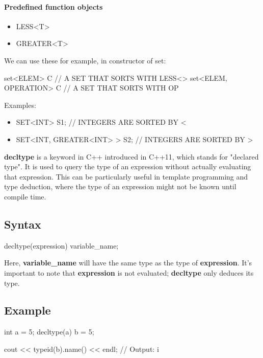 \documentclass{report}
\begin{document}
   \paragraph{Predefined function objects}
   \bigbreak \noindent \bigbreak \noindent 
   \begin{itemize}
       \item LESS<T>
       \item GREATER<T>
    \end{itemize}
   We can use these for example, in constructor of set:
   \bigbreak \noindent 
   \begin{cppcode}
       set<ELEM> C // A SET THAT SORTS WITH LESS<>
        set<ELEM, OPERATION> C // A SET THAT SORTS WITH OP
   \end{cppcode}
   \bigbreak \noindent 
     Examples:
   \begin{itemize}
       \item SET<INT> S1; // INTEGERS ARE SORTED BY <
       \item SET<INT, GREATER<INT> > S2; // INTEGERS ARE SORTED BY >
   \end{itemize}

   \bigbreak \noindent 
   \bigbreak \noindent 
   \begin{concept}
       \textbf{decltype} is a keyword in C++ introduced in C++11, which stands for "declared type". It is used to query the type of an expression without actually evaluating that expression. This can be particularly useful in template programming and type deduction, where the type of an expression might not be known until compile time.
   \end{concept}
   \bigbreak \noindent 
   \subsection{Syntax}
   \bigbreak \noindent 
   \begin{cppcode}
       decltype(expression) variable_name;
   \end{cppcode}
   \bigbreak \noindent 
   Here, \textbf{variable\_name} will have the same type as the type of \textbf{expression}. It's important to note that \textbf{expression} is not evaluated; \textbf{decltype} only deduces its type.
   \bigbreak \noindent 
   \subsection{Example}
   \bigbreak \noindent 
   \begin{cppcode}
       int a = 5;
       decltype(a) b = 5;

       cout << typeid(b).name() << endl; // Output: i
   \end{cppcode}
\end{document}

